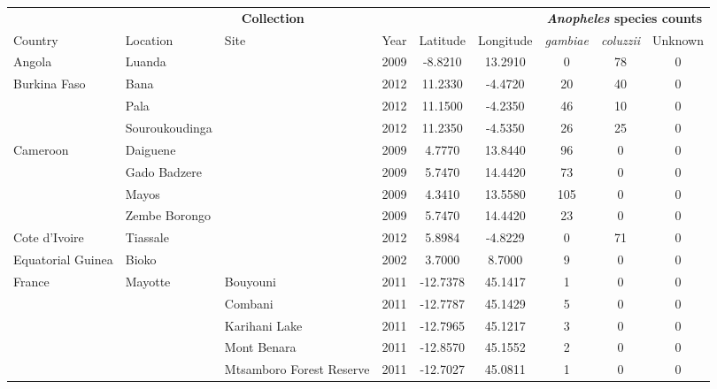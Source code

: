 
\begin{tabular}{lllcccccc}
\toprule
\multicolumn{6}{c}{\textbf{Collection}} &
\multicolumn{3}{c}{\textbf{\emph{Anopheles} species counts}}\\
\cmidrule(r){1-6}
\cmidrule(r){7-9}
Country & 
Location & 
Site &
Year &
Latitude & 
Longitude & 
\emph{gambiae} & 
\emph{coluzzii} & 
Unknown\\
\midrule

Angola & Luanda &  & 2009 & -8.8210 & 13.2910 & 0 & 78 & 0 \\

Burkina Faso & Bana &  & 2012 & 11.2330 & -4.4720 & 20 & 40 & 0 \\

 & Pala &  & 2012 & 11.1500 & -4.2350 & 46 & 10 & 0 \\

 & Souroukoudinga &  & 2012 & 11.2350 & -4.5350 & 26 & 25 & 0 \\

Cameroon & Daiguene &  & 2009 & 4.7770 & 13.8440 & 96 & 0 & 0 \\

 & Gado Badzere &  & 2009 & 5.7470 & 14.4420 & 73 & 0 & 0 \\

 & Mayos &  & 2009 & 4.3410 & 13.5580 & 105 & 0 & 0 \\

 & Zembe Borongo &  & 2009 & 5.7470 & 14.4420 & 23 & 0 & 0 \\

Cote d'Ivoire & Tiassale &  & 2012 & 5.8984 & -4.8229 & 0 & 71 & 0 \\

Equatorial Guinea & Bioko &  & 2002 & 3.7000 & 8.7000 & 9 & 0 & 0 \\

France & Mayotte & Bouyouni & 2011 & -12.7378 & 45.1417 & 1 & 0 & 0 \\

 &  & Combani & 2011 & -12.7787 & 45.1429 & 5 & 0 & 0 \\

 &  & Karihani Lake & 2011 & -12.7965 & 45.1217 & 3 & 0 & 0 \\

 &  & Mont Benara & 2011 & -12.8570 & 45.1552 & 2 & 0 & 0 \\

 &  & Mtsamboro Forest Reserve & 2011 & -12.7027 & 45.0811 & 1 & 0 & 0 \\


\end{tabular}
